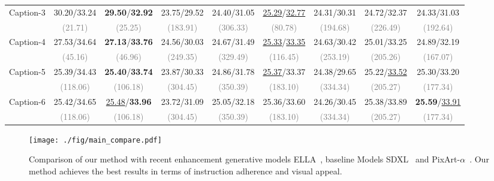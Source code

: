 \begin{table*}[h]
{\begin{tabular}{lcccccccc}
Caption-3 & 30.20/33.24 & \textbf{29.50}/\textbf{32.92} & 23.75/29.52 & 24.40/31.05 & \underline{25.29}/\underline{32.77} & 24.31/30.31 & 24.72/32.37 & 24.33/31.03 \\
& \textcolor{gray}{(21.71)} & \textcolor{gray}{(25.25)} & \textcolor{gray}{(183.91)} & \textcolor{gray}{(306.33)} & \textcolor{gray}{(80.78)} & \textcolor{gray}{(194.68)} & \textcolor{gray}{(226.49)} & \textcolor{gray}{(192.64)} \\
 \hline
 
Caption-4 & 27.53/34.64 & \textbf{27.13}/\textbf{33.76} & 24.56/30.03 & 24.67/31.49 & \underline{25.33}/\underline{33.35} & 24.63/30.42 & 25.01/33.25 & 24.89/32.19 \\
& \textcolor{gray}{(45.16)} & \textcolor{gray}{(46.96)} & \textcolor{gray}{(249.35)} & \textcolor{gray}{(329.49)} & \textcolor{gray}{(116.45)} & \textcolor{gray}{(253.19)} & \textcolor{gray}{(205.26)} & \textcolor{gray}{(167.07)} \\
 \hline
 
Caption-5 & 25.39/34.43 & \colorbox{pz}{\textbf{25.40}}/\colorbox{pz}{\textbf{33.74}} & 23.87/30.33 & 24.86/31.78 & \underline{25.37}/33.37 & 24.38/29.65 & 25.22/\underline{33.52} & 25.30/33.20 \\
& \textcolor{gray}{(118.06)} & \textcolor{gray}{(106.18)} & \textcolor{gray}{(304.45)} & \textcolor{gray}{(350.39)} & \textcolor{gray}{(183.10)} & \textcolor{gray}{(334.34)} & \textcolor{gray}{(205.27)} & \textcolor{gray}{(177.34)} \\
 \hline
 
Caption-6 & 25.42/34.65 & \colorbox{pz}{\underline{25.48}}/\textbf{33.96} & 23.72/31.09 & 25.05/32.18 & 25.36/33.60 & 24.26/30.45 & 25.38/33.89 & \textbf{25.59}/\underline{33.91} \\
& \textcolor{gray}{(118.06)} & \textcolor{gray}{(106.18)} & \textcolor{gray}{(304.45)} & \textcolor{gray}{(350.39)} & \textcolor{gray}{(183.10)} & \textcolor{gray}{(334.34)} & \textcolor{gray}{(205.27)} & \textcolor{gray}{(177.34)} \\
\toprule[1.2pt]
\end{tabular}
}
\label{tab:hi scores}
\end{table*}

\begin{figure*}[t]
	\centering
	\texttt{[image: ./fig/main\_compare.pdf]}

	\caption{Comparison of our method with recent enhancement generative models ELLA~\cite{hu2024ella}, baseline Models SDXL~\cite{podell2023sdxl} and PixArt-$\alpha$~\cite{chen2023pixart}. Our method achieves the best results in terms of instruction adherence and visual appeal.}
	\label{fig:comparasions}
\end{figure*}





